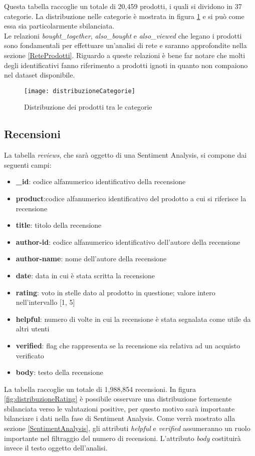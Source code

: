 Questa tabella raccoglie un totale di 20,459 prodotti, i quali si dividono in 37 categorie. La distribuzione nelle categorie è mostrata in figura \ref{fig:distribuzioneCategorie} e si può come essa sia particolarmente sbilanciata. \\
Le relazioni \textit{bought\_together}, \textit{also\_bought} e \textit{also\_viewed} che legano i prodotti sono fondamentali per effettuare un'analisi di rete e saranno approfondite nella sezione \ref{ReteProdotti}. Riguardo a queste relazioni è bene far notare che molti degli identificativi fanno riferimento a prodotti ignoti in quanto non compaiono nel dataset disponibile.

\begin{figure}[H]
    \texttt{[image: distribuzioneCategorie]}\centering
    \caption{Distribuzione dei prodotti tra le categorie}\label{fig:distribuzioneCategorie}
\end{figure}

\subsection{Recensioni}\label{Recensioni}
La tabella \textit{reviews}, che sarà oggetto di una Sentiment Analysis, si compone dai seguenti campi:
\begin{itemize}
    \item \textbf{\_id}: codice alfanumerico identificativo della recensione
    \item \textbf{product}:codice alfanumerico identificativo del prodotto a cui si riferisce la recensione
    \item \textbf{title}: titolo della recensione
    \item \textbf{author-id}: codice alfanumerico identificativo dell'autore della recensione
    \item \textbf{author-name}: nome dell'autore della recensione
    \item \textbf{date}: data in cui è stata scritta la recensione
    \item \textbf{rating}: voto in stelle dato al prodotto in questione; valore intero nell'intervallo [1, 5]
    \item \textbf{helpful}: numero di volte in cui la recensione è stata segnalata come utile da altri utenti
    \item \textbf{verified}: flag che rappresenta se la recensione sia relativa ad un acquisto verificato
    \item \textbf{body}: testo della recensione
\end{itemize} 
La tabella raccoglie un totale di 1,988,854 recensioni. In figura \ref{fig:distribuzioneRating} è possibile osservare una distribuzione fortemente sbilanciata verso le valutazioni positive, per questo motivo sarà importante bilanciare i dati nella fase di Sentiment Analysis. Come verrà mostrato alla sezione \ref{SentimentAnalysis}, gli attributi \textit{helpful} e \textit{verified} assumeranno un ruolo importante nel filtraggio del numero di recensioni. L'attributo \textit{body} costituirà invece il testo oggetto dell'analisi.

